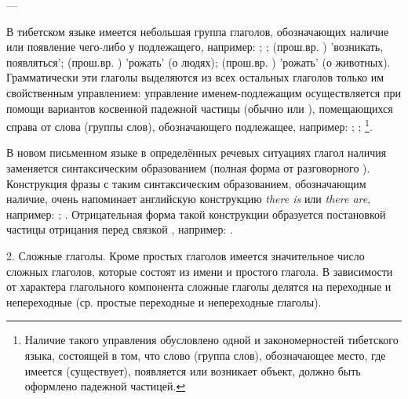 \begin{description}
	\item{} --- 
\end{description}

В тибетском языке имеется небольшая группа глаголов,
обозначающих наличие или появление чего-либо у подлежащего, например:
;
;
 (прош.вр. ) 'возникать, появляться';
 (прош.вр. ) 'рожать' (о людях);
 (прош.вр. ) 'рожать' (о животных).
Грамматически эти глаголы выделяются из всех остальных глаголов только им свойственным управлением: управление именем-подлежащим осуществляется при помощи вариантов косвенной падежной частицы (обычно  или ), помещающихся справа от слова (группы слов), обозначающего подлежащее, например:
;
;
\footnote[34]{Наличие такого управления обусловлено одной и закономерностей тибетского языка, состоящей в том, что слово (группа слов), обозначающее место, где имеется (существует), появляется или возникает объект, должно быть оформлено падежной частицей.}.

В новом письменном языке в определённых речевых ситуациях глагол наличия  заменяется синтаксическим образованием  (полная форма от разговорного ). Конструкция фразы с таким синтаксическим образованием, обозначающим наличие, очень напоминает английскую конструкцию \emph{there is} или \emph{there are}, например:
;
.
Отрицательная форма такой конструкции образуется постановкой частицы отрицания перед связкой , например:
.

2. Сложные глаголы. Кроме простых глаголов имеется значительное число сложных глаголов, которые состоят из имени и простого глагола. В зависимости от характера глагольного компонента сложные глаголы делятся на переходные и непереходные (ср. простые переходные и непереходные глаголы).

